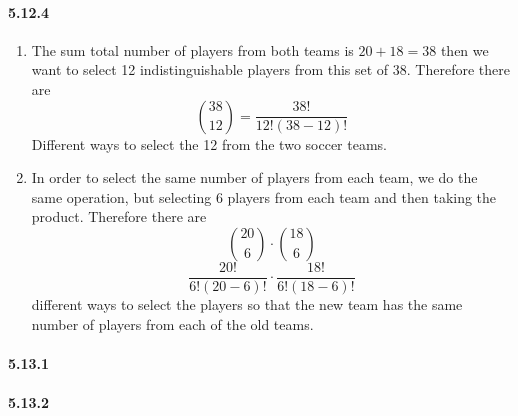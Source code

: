 \documentclass[11pt, letterpaper, twocolumn, fleqn]{article}
\begin{document}
\paragraph{5.12.4}
\begin{enumerate}
  \item The sum total number of players from both teams is $20+18=38$ then we want to select 12 indistinguishable players from this set of 38. Therefore there are
    $$\binom{38}{12} = \frac{38!}{12!(38-12)!}$$
  Different ways to select the 12 from the two soccer teams.
  \item In order to select the same number of players from each team, we do the same operation, but selecting 6 players from each team and then taking the product. Therefore there are
    $$\binom{20}{6} \cdot \binom{18}{6}$$
    $$\frac{20!}{6!(20-6)!} \cdot \frac{18!}{6!(18-6)!}$$
  different ways to select the players so that the new team has the same number of players from each of the old teams.
\end{enumerate}

\paragraph{5.13.1}
\paragraph{5.13.2}
\end{document}

